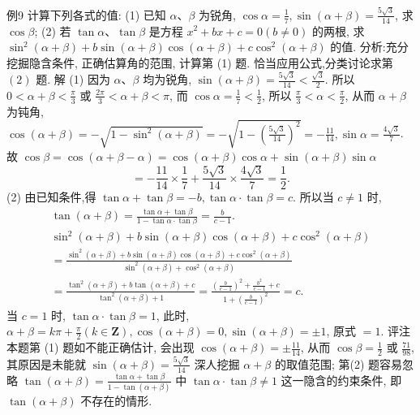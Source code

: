 例9 计算下列各式的值:
(1) 已知 $\alpha 、 \beta$ 为锐角, $\cos \alpha=\frac{1}{7}, \sin (\alpha+\beta)=\frac{5 \sqrt{3}}{14}$, 求 $\cos \beta$;
(2) 若 $\tan \alpha 、 \tan \beta$ 是方程 $x^2+b x+c=0(b \neq 0)$ 的两根, 求 $\sin ^2(\alpha+ \beta)+b \sin (\alpha+\beta) \cos (\alpha+\beta)+c \cos ^2(\alpha+\beta)$ 的值.
分析:充分挖掘隐含条件, 正确估算角的范围, 计算第 (1) 题.
恰当应用公式,分类讨论求第 $(2)$ 题.
解 (1) 因为 $\alpha 、 \beta$ 均为锐角, $\sin (\alpha+\beta)=\frac{5 \sqrt{3}}{14}<\frac{\sqrt{3}}{2}$. 所以 $0<\alpha+\beta< \frac{\pi}{3}$ 或 $\frac{2 \pi}{3}<\alpha+\beta<\pi$, 而 $\cos \alpha=\frac{1}{7}<\frac{1}{2}$, 所以 $\frac{\pi}{3}<\alpha<\frac{\pi}{2}$, 从而 $\alpha+\beta$ 为钝角, $\cos (\alpha+\beta)=-\sqrt{1-\sin ^2(\alpha+\beta)}=-\sqrt{1-\left(\frac{5 \sqrt{3}}{14}\right)^2}=-\frac{11}{14}, \sin \alpha=\frac{4 \sqrt{3}}{7}$.
故 $\cos \beta=\cos (\alpha+\beta-\alpha)=\cos (\alpha+\beta) \cos \alpha+\sin (\alpha+\beta) \sin \alpha$
$$
=-\frac{11}{14} \times \frac{1}{7}+\frac{5 \sqrt{3}}{14} \times \frac{4 \sqrt{3}}{7}=\frac{1}{2} .
$$
(2) 由已知条件,得 $\tan \alpha+\tan \beta=-b, \tan \alpha \cdot \tan \beta=c$. 所以当 $c \neq 1$ 时,
$$
\begin{gathered}
\tan (\alpha+\beta)=\frac{\tan \alpha+\tan \beta}{1-\tan \alpha \cdot \tan \beta}=\frac{b}{c-1} . \\
\sin ^2(\alpha+\beta)+b \sin (\alpha+\beta) \cos (\alpha+\beta)+c \cos ^2(\alpha+\beta) \\
=\frac{\sin ^2(\alpha+\beta)+b \sin (\alpha+\beta) \cos (\alpha+\beta)+c \cos ^2(\alpha+\beta)}{\sin ^2(\alpha+\beta)+\cos ^2(\alpha+\beta)} \\
=\frac{\tan ^2(\alpha+\beta)+b \tan (\alpha+\beta)+c}{\tan ^2(\alpha+\beta)+1}=\frac{\left(\frac{b}{c-1}\right)^2+\frac{b^2}{c-1}+c}{1+\left(\frac{b}{c-1}\right)^2}=c .
\end{gathered}
$$
当 $c=1$ 时, $\tan \alpha \cdot \tan \beta=1$, 此时, $\alpha+\beta=k \pi+\frac{\pi}{2}(k \in \mathbf{Z}), \cos (\alpha+ \beta)=0, \sin (\alpha+\beta)= \pm 1$, 原式 $=1$.
评注本题第 (1) 题如不能正确估计, 会出现 $\cos (\alpha+\beta)= \pm \frac{11}{14}$, 从而 $\cos \beta=\frac{1}{2}$ 或 $\frac{71}{98}$, 其原因是未能就 $\sin (\alpha+\beta)=\frac{5 \sqrt{3}}{14}$ 深人挖掘 $\alpha+\beta$ 的取值范围;
第(2) 题容易忽略 $\tan (\alpha+\beta)=\frac{\tan \alpha+\tan \beta}{1-\tan (\alpha+\beta)}$ 中 $\tan \alpha \cdot \tan \beta \neq 1$ 这一隐含的约束条件, 即 $\tan (\alpha+\beta)$ 不存在的情形.



